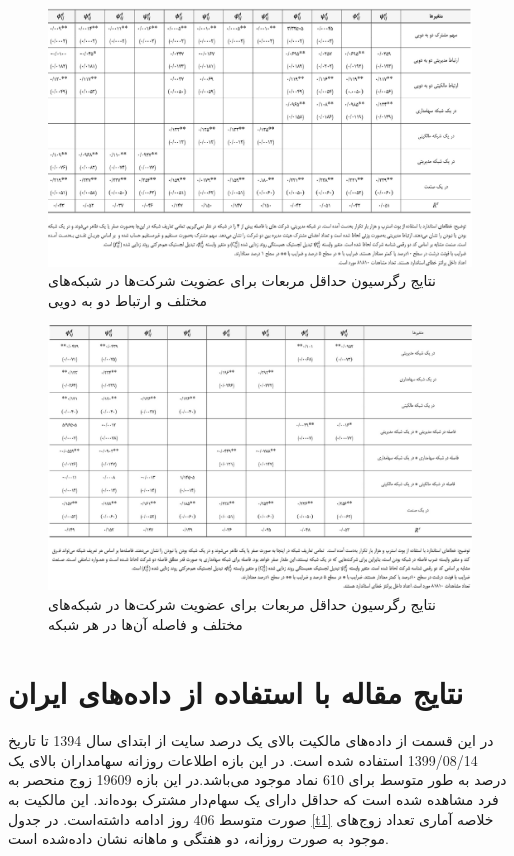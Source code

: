 \documentclass[12pt]{article}
\begin{document}
\begin{landscape}
\begin{figure}
\centering
\includegraphics[width=\columnwidth]{Table2.png}
\caption{نتایج رگرسیون حداقل مربعات برای عضویت شرکت‌ها در شبکه‌های مختلف و ارتباط دو به دویی}
\label{g2}
\end{figure}
\begin{figure}
\centering
\includegraphics[width=\columnwidth]{Table3.png}
\caption{نتایج رگرسیون حداقل مربعات برای عضویت شرکت‌ها در شبکه‌های مختلف و فاصله آن‌ها در هر شبکه}
\label{g3}
\end{figure}
\end{landscape}


\section{نتایج مقاله با استفاده از داده‌های ایران}
در این قسمت  از داده‌های مالکیت بالای یک درصد سایت 
از ابتدای سال 1394 تا تاریخ 1399/08/14 استفاده شده است. در این بازه اطلاعات روزانه سهامداران بالای یک درصد به طور متوسط برای 610 نماد موجود می‌باشد.در این بازه 19609 زوج منحصر به فرد مشاهده شده است که حداقل دارای یک سهام‌دار مشترک بوده‌اند. این مالکیت به صورت متوسط
$ { 406} $
 روز ادامه داشته‌است. در جدول 
\ref{t1}
خلاصه آماری تعداد زوج‌های موجود به صورت روزانه، دو هفتگی و ماهانه نشان داده‌شده است.
\end{document}
